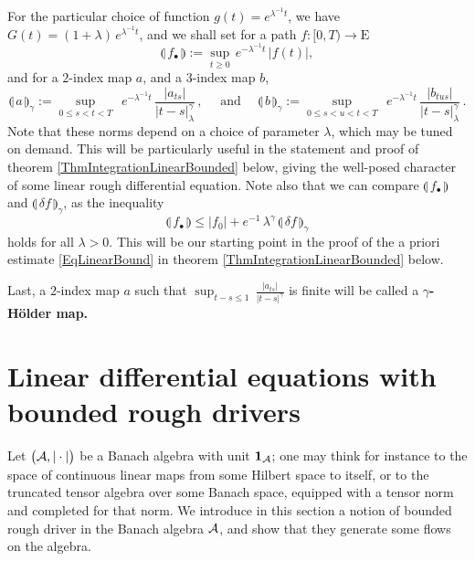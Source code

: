 \documentclass[11pt,a4paper]{amsart}
\renewcommand{\leq}{\leqslant}
\renewcommand{\geq}{\geqslant}
\newcommand{\ssk}{\smallskip}
\numberwithin{equation}{section} %
\begin{document}
\medskip

For the particular choice of function $g(t) = e^{\lambda^{-1}t}$, we have $G(t) = (1+\lambda)\,e^{\lambda^{-1}t}$, and we shall set for a path $f : [0,T)\rightarrow \textrm{E}$
\begin{equation}
\label{EqDefnNormFunction}
\llparenthesis\, f_\bullet \,\rrparenthesis :=  \underset{t\geq 0}{\sup}\,e^{-\lambda^{-1} t}\,\big| f(t) \big|,
\end{equation}
and for a $2$-index map $a$, and a  $3$-index map $b$,
\begin{equation}
\label{EqDefnNormMultiIndexMaps}
\llparenthesis\, a \,\rrparenthesis_\gamma := \underset{0\leq s<t<T}{\sup} \;\, e^{-\lambda^{-1} t} \,\frac{\big| a_{ts}\big|}{|t-s|_\lambda^\gamma}\,, \quad \textrm{ and }\quad 
\llparenthesis\, b \,\rrparenthesis_\gamma := \underset{0\leq s< u<t<T}{\sup} \;\, e^{-\lambda^{-1} t} \,\frac{\big| b_{tus}\big|}{|t-s|_\lambda^\gamma}\,.
\end{equation}
Note that these norms depend on a choice of parameter $\lambda$, which may be tuned on demand. This will be particularly useful in the statement and proof of theorem \ref{ThmIntegrationLinearBounded} below, giving the well-posed character of some linear rough differential equation. Note also that we can compare $\llparenthesis\, f_\bullet \,\rrparenthesis$ and $\llparenthesis\, \delta f \,\rrparenthesis_\gamma$, as the inequality
$$
\llparenthesis\, f_\bullet \,\rrparenthesis \leq \big|f_0\big| + e^{-1}\,\lambda^\gamma\,\llparenthesis\, \delta f \,\rrparenthesis_\gamma
$$
holds for all $\lambda>0$. This will be our starting point in the proof of the a priori estimate \eqref{EqLinearBound} in theorem \ref{ThmIntegrationLinearBounded} below.

\ssk

Last, a $2$-index map $a$ such that $\sup_{t-s\leq 1}\,\frac{| a_{ts} |}{|t-s|^\gamma}$ is finite will be called a $\gamma$\textbf{-H\"older map.}


\section{Linear differential equations with bounded rough drivers}
\label{SectionBoundedDrivers}

Let $\big(\mathcal{A},|\cdot|\big)$ be a Banach algebra with unit ${\bf 1}_{\mathcal{A}}$; one may think for instance to the space of continuous linear maps from some Hilbert space to itself, or to the truncated tensor algebra over some Banach space, equipped with a tensor norm and completed for that norm. We introduce in this section a notion of bounded rough driver in the Banach algebra $\mathcal{A}$, and show that they generate some flows on the algebra. 
\end{document}
